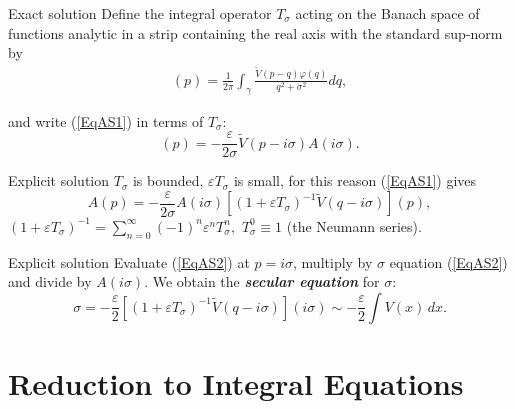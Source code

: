 \documentclass{beamer}
\begin{document}
\begin{frame}{Exact solution}
 Define the integral operator $T_\sigma$  acting on the Banach space of functions analytic in a strip containing the real axis with the standard sup-norm by
\begin{align*}
[T_\sigma \varphi(q)](p)=\frac{1}{2\pi}\int_\gamma \frac{\tilde{V}(p-q)\varphi(q)}{q^2+\sigma^2}dq,
\end{align*}

 and write (\ref{EqAS1}) in terms of $T_\sigma$:
\begin{equation*} [(1+\varepsilon T_\sigma)A(q)](p)=-\frac{\varepsilon}{2\sigma}\tilde{V}(p-i\sigma)A(i\sigma).\end{equation*}



\end{frame}

\begin{frame}{Explicit solution}
$T_\sigma$ is bounded,
$\varepsilon T_\sigma$ is small, for this reason (\ref{EqAS1}) gives
\begin{equation}\label{EqAS2}
A(p)=-\frac{\varepsilon}{2\sigma}A(i\sigma)[(1+\varepsilon T_{\sigma})^{-1}\tilde{V}(q-i\sigma)](p),
\end{equation}
$(1+\varepsilon T_{\sigma})^{-1}=\sum_{n=0}^{\infty}(-1)^n\varepsilon^n T_\sigma^n,$ $T_\sigma^0\equiv 1$ (the Neumann series).
\end{frame}


\begin{frame}{Explicit solution}
 Evaluate (\ref{EqAS2}) at $p=i\sigma$,
multiply by $\sigma$  equation (\ref{EqAS2}) and divide by $A(i\sigma)$. We obtain the \emph{\textbf{secular equation}} for $\sigma:$
  \begin{equation}\label{eqsES}
    \sigma=-\frac{\varepsilon}{2} [(1+\varepsilon T_{\sigma})^{-1}\tilde{V}(q-i\sigma)](i\sigma)\sim-\frac\varepsilon2\int V(x)\,dx.
  \end{equation}
\end{frame}






\section{Reduction to Integral Equations}
\end{document}
